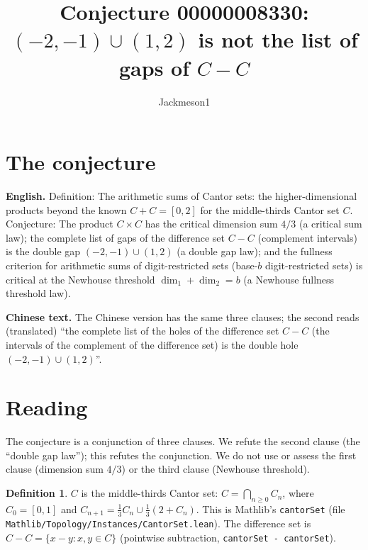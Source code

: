 \documentclass[11pt]{article}
\title{Conjecture 00000008330: $(-2,-1)\cup(1,2)$ is not the list of gaps of $C-C$}
\author{Jackmeson1}
\date{}
\theoremstyle{definition}
\newtheorem{definition}[theorem]{Definition}
\theoremstyle{remark}
\begin{document}
\maketitle

\section{The conjecture}

\textbf{English.} Definition: The arithmetic sums of Cantor sets: the higher-dimensional products
beyond the known $C + C = [0,2]$ for the middle-thirds Cantor set $C$. Conjecture: The product
$C \times C$ has the critical dimension sum $4/3$ (a critical sum law); the complete list of gaps of
the difference set $C - C$ (complement intervals) is the double gap $(-2,-1) \cup (1,2)$ (a double
gap law); and the fullness criterion for arithmetic sums of digit-restricted sets (base-$b$
digit-restricted sets) is critical at the Newhouse threshold $\dim_1 + \dim_2 = b$ (a Newhouse
fullness threshold law).

\textbf{Chinese text.} The Chinese version has the same three clauses; the second reads (translated)
``the complete list of the holes of the difference set $C-C$ (the intervals of the complement of the
difference set) is the double hole $(-2,-1)\cup(1,2)$''.

\section{Reading}

The conjecture is a conjunction of three clauses. We refute the second clause (the ``double gap
law''); this refutes the conjunction. We do not use or assess the first clause (dimension sum $4/3$)
or the third clause (Newhouse threshold).

\begin{definition}
$C$ is the middle-thirds Cantor set: $C=\bigcap_{n\ge 0} C_n$, where $C_0=[0,1]$ and
$C_{n+1}=\tfrac13 C_n \cup \tfrac13(2+C_n)$. This is Mathlib's \texttt{cantorSet} (file
\texttt{Mathlib/Topology/Instances/CantorSet.lean}). The difference set is
$C-C=\{x-y : x,y\in C\}$ (pointwise subtraction, \texttt{cantorSet - cantorSet}).
\end{definition}
\end{document}
